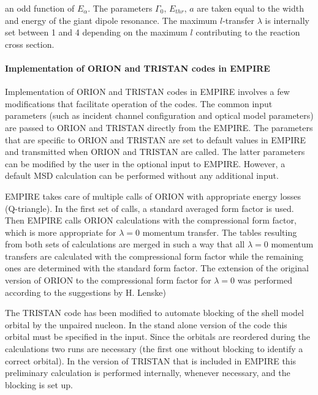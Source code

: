 \documentclass[twocolumn,amsmath,amssymb,10pt,groupedaddress,a4paper]{revtex4}
\begin{document}
\noindent an odd function of $E_{\alpha}$. The parameters $\Gamma_{0},\, E_{thr},\, a$
are taken equal to the width and energy of the giant dipole resonance.
The maximum $l$-transfer $\lambda$ is internally set between 1 and
4 depending on the maximum $l$ contributing to the reaction cross
section.


\paragraph{Implementation of ORION and TRISTAN codes in EMPIRE}

Implementation of ORION and TRISTAN codes in EMPIRE
involves a few modifications that facilitate operation of the codes.
The common input parameters (such as incident channel configuration
and optical model parameters) are passed to ORION and TRISTAN directly
from the EMPIRE. The parameters that are specific to ORION and TRISTAN
are set to default values in EMPIRE and transmitted when ORION and
TRISTAN are called. The latter parameters can be modified by the user
in the optional input to EMPIRE. However, a default MSD
calculation can be performed without any additional input.

EMPIRE takes care of multiple calls of ORION with appropriate
energy losses (Q-triangle). In the first set of calls, a standard
averaged form factor is used. Then EMPIRE calls ORION calculations
with the compressional form factor, which is more appropriate for
$\lambda=0$ momentum transfer. The tables resulting from both sets
of calculations are merged in such a way that all $\lambda=0$ momentum
transfers are calculated with the compressional form factor while
the remaining ones are determined with the standard form factor. The
extension of the original version of ORION to the compressional form
factor for $\lambda=0$ was performed according to the suggestions
by H. Lenske)

The TRISTAN code has been modified to automate blocking
of the shell model orbital by the unpaired nucleon. In the stand alone
version of the code this orbital must be specified in the input. Since
the orbitals are reordered during the calculations two runs are necessary
(the first one without blocking to identify a correct orbital). In
the version of TRISTAN that is included in EMPIRE this preliminary
calculation is performed internally, whenever necessary, and the blocking
is set up.
\end{document}
